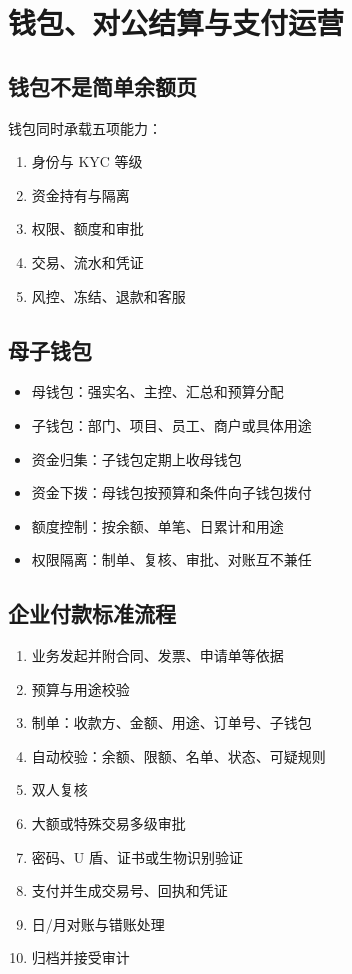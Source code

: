 \chapter{钱包、对公结算与支付运营}\label{ux94b1ux5305ux5bf9ux516cux7ed3ux7b97ux4e0eux652fux4ed8ux8fd0ux8425}

\section{钱包不是简单余额页}\label{ux94b1ux5305ux4e0dux662fux7b80ux5355ux4f59ux989dux9875}

钱包同时承载五项能力：

\begin{enumerate}
\def\labelenumi{\arabic{enumi}.}
\tightlist
\item
  身份与 KYC 等级
\item
  资金持有与隔离
\item
  权限、额度和审批
\item
  交易、流水和凭证
\item
  风控、冻结、退款和客服
\end{enumerate}

\section{母子钱包}\label{ux6bcdux5b50ux94b1ux5305}

\begin{itemize}
\tightlist
\item
  母钱包：强实名、主控、汇总和预算分配
\item
  子钱包：部门、项目、员工、商户或具体用途
\item
  资金归集：子钱包定期上收母钱包
\item
  资金下拨：母钱包按预算和条件向子钱包拨付
\item
  额度控制：按余额、单笔、日累计和用途
\item
  权限隔离：制单、复核、审批、对账互不兼任
\end{itemize}

\section{企业付款标准流程}\label{ux4f01ux4e1aux4ed8ux6b3eux6807ux51c6ux6d41ux7a0b}

\begin{enumerate}
\def\labelenumi{\arabic{enumi}.}
\tightlist
\item
  业务发起并附合同、发票、申请单等依据
\item
  预算与用途校验
\item
  制单：收款方、金额、用途、订单号、子钱包
\item
  自动校验：余额、限额、名单、状态、可疑规则
\item
  双人复核
\item
  大额或特殊交易多级审批
\item
  密码、U 盾、证书或生物识别验证
\item
  支付并生成交易号、回执和凭证
\item
  日/月对账与错账处理
\item
  归档并接受审计
\end{enumerate}

